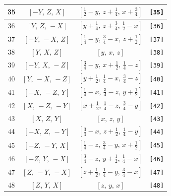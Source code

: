\documentclass[fleqn,8pt]{jsarticle}
\begin{document}
\begin{longtable}{cccc}
35 & $\left[ - Y,\, Z,\, X \right]$ & $\left[ \frac{1}{2} - y,\, z + \frac{1}{4},\, x + \frac{3}{4} \right]$ & {\tt [35]} \\ \hline
36 & $\left[ Y,\, Z,\, - X \right]$ & $\left[ y + \frac{1}{4},\, z + \frac{3}{4},\, \frac{1}{2} - x \right]$ & {\tt [36]} \\ \hline
37 & $\left[ - Y,\, - X,\, Z \right]$ & $\left[ \frac{1}{4} - y,\, \frac{3}{4} - x,\, z + \frac{1}{2} \right]$ & {\tt [37]} \\ \hline
38 & $\left[ Y,\, X,\, Z \right]$ & $\left[ y,\, x,\, z \right]$ & {\tt [38]} \\ \hline
39 & $\left[ - Y,\, X,\, - Z \right]$ & $\left[ \frac{3}{4} - y,\, x + \frac{1}{2},\, \frac{1}{4} - z \right]$ & {\tt [39]} \\ \hline
40 & $\left[ Y,\, - X,\, - Z \right]$ & $\left[ y + \frac{1}{2},\, \frac{1}{4} - x,\, \frac{3}{4} - z \right]$ & {\tt [40]} \\ \hline
41 & $\left[ - X,\, - Z,\, Y \right]$ & $\left[ \frac{1}{4} - x,\, \frac{3}{4} - z,\, y + \frac{1}{2} \right]$ & {\tt [41]} \\ \hline
42 & $\left[ X,\, - Z,\, - Y \right]$ & $\left[ x + \frac{1}{2},\, \frac{1}{4} - z,\, \frac{3}{4} - y \right]$ & {\tt [42]} \\ \hline
43 & $\left[ X,\, Z,\, Y \right]$ & $\left[ x,\, z,\, y \right]$ & {\tt [43]} \\ \hline
44 & $\left[ - X,\, Z,\, - Y \right]$ & $\left[ \frac{3}{4} - x,\, z + \frac{1}{2},\, \frac{1}{4} - y \right]$ & {\tt [44]} \\ \hline
45 & $\left[ - Z,\, - Y,\, X \right]$ & $\left[ \frac{1}{4} - z,\, \frac{3}{4} - y,\, x + \frac{1}{2} \right]$ & {\tt [45]} \\ \hline
46 & $\left[ - Z,\, Y,\, - X \right]$ & $\left[ \frac{3}{4} - z,\, y + \frac{1}{2},\, \frac{1}{4} - x \right]$ & {\tt [46]} \\ \hline
47 & $\left[ Z,\, - Y,\, - X \right]$ & $\left[ z + \frac{1}{2},\, \frac{1}{4} - y,\, \frac{3}{4} - x \right]$ & {\tt [47]} \\ \hline
48 & $\left[ Z,\, Y,\, X \right]$ & $\left[ z,\, y,\, x \right]$ & {\tt [48]} \\
\end{longtable}
\end{document}
